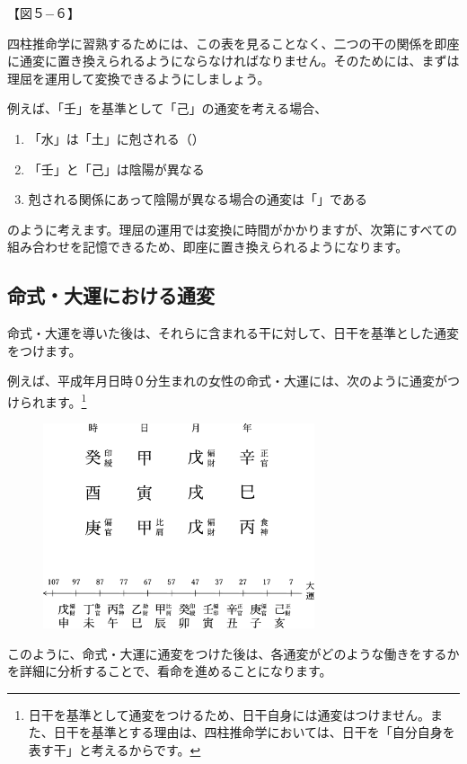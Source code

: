 \documentclass[a5paper,11pt,dvipdfmx]{tarticle}
\begin{document}
【図５−６】

四柱推命学に習熟するためには、この表を見ることなく、二つの干の関係を即座に通変に置き換えられるようにならなければなりません。そのためには、まずは理屈を運用して変換できるようにしましょう。

例えば、「壬」を基準として「己」の通変を考える場合、

\begin{enumerate}
\item 「水」は「土」に剋される（）
\item 「壬」と「己」は陰陽が異なる
\item 剋される関係にあって陰陽が異なる場合の通変は「」である
\end{enumerate}
のように考えます。理屈の運用では変換に時間がかかりますが、次第にすべての組み合わせを記憶できるため、即座に置き換えられるようになります。

\subsection{命式・大運における通変}
命式・大運を導いた後は、それらに含まれる干に対して、日干を基準とした通変をつけます。

例えば、平成年月日時０分生まれの女性の命式・大運には、次のように通変がつけられます。\footnote{日干を基準として通変をつけるため、日干自身には通変はつけません。また、日干を基準とする理由は、四柱推命学においては、日干を「自分自身を表す干」と考えるからです。}

\begin{figure}[h]
  \includegraphics[width=80mm,angle=90]{figs/figure5-7.eps}
\end{figure}

このように、命式・大運に通変をつけた後は、各通変がどのような働きをするかを詳細に分析することで、看命を進めることになります。
\end{document}
